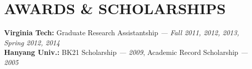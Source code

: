 \section{AWARDS \& SCHOLARSHIPS}
\vspace{0.07in}
{\bf Virginia Tech:} Graduate Research Assistantship {\footnotesize{\it --- Fall
2011, 2012, 2013, Spring 2012, 2014}} \\
{\bf Hanyang Univ.:} BK21 Scholarship {\footnotesize{\it --- 2009}},
Academic Record Scholarship {\footnotesize{\it --- 2005}}

